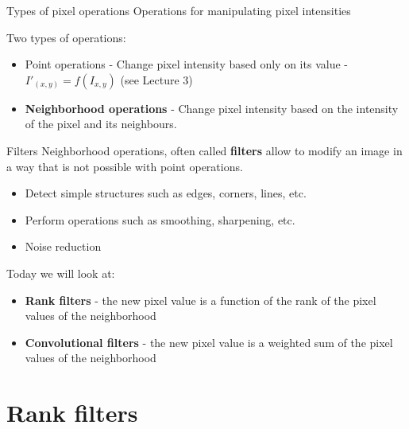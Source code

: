 \documentclass[9pt, aspectratio=169]{beamer}
\begin{document}
\begin{frame}
\begin{columns}
\begin{column}{0.2\textwidth}
        \end{column}
    \end{columns}
\end{frame}

\begin{frame}
    {Types of pixel operations}
    Operations for manipulating pixel intensities

    Two types of operations:
    \begin{itemize}
        \item Point operations - Change pixel intensity based only on its value - $I'_{(x, y)} = f(I_{x, y})$ (see Lecture 3)
        \item \textbf{Neighborhood operations} - Change pixel intensity based on the intensity of the pixel and its neighbours.
    \end{itemize}
\end{frame}

\begin{frame}
    {Filters}
    Neighborhood operations, often called \textbf{filters} allow to modify an image in a way that is not possible with point operations.

    \begin{itemize}
        \item Detect simple structures such as edges, corners, lines, etc.
        \item Perform operations such as smoothing, sharpening, etc.
        \item Noise reduction
    \end{itemize}
    \pause
    Today we will look at:
    \begin{itemize}
        \item \textbf{Rank filters} - the new pixel value is a function of the rank of the pixel values of the neighborhood
        \item \textbf{Convolutional filters} - the new pixel value is a weighted sum of the pixel values of the neighborhood
    \end{itemize}

\end{frame}

\section{Rank filters}
\end{document}
